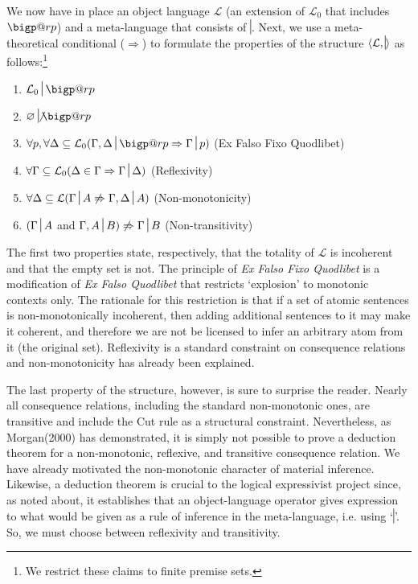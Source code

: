 \documentclass{article}
\makeatletter
\newcommand{\nc}{\turnstile{s}{w}{}{}{n}}
\newcommand{\bigperp}{%
  \mathop{\mathpalette\bigp@rp\relax}%
  \displaylimits
}
\newcommand{\bigp@rp}[2]{%
  \vcenter{
    \m@th\hbox{\scalebox{\ifx#1\displaystyle2.1\else1.5\fi}{$#1\perp$}}
  }%
}
\makeatother
\begin{document}
We now have in place an object language $ \mathcal{L} $ (an extension of  $ \mathcal{L}_0 $ that includes $ \bigperp $) and a meta-language that consists of $ \nc $. Next, we use a meta-theoretical conditional ($ \Rightarrow $) to formulate the properties of the structure $ \langle \mathcal{L}, \nc \rangle  $ as follows:\footnote{We restrict these claims to finite premise sets.}

\begin{enumerate}
	\item $  \mathcal{L}_0\nc\bigperp$
	\item $ \varnothing\not\nc\bigperp $
	\item  $ \forall p, \forall\Delta\subseteq\mathcal{L}_0(\Gamma, \Delta \nc\bigperp \Rightarrow \Gamma\nc p) $ (Ex Falso Fixo Quodlibet)
	\item $\forall \Gamma\subseteq\mathcal{L}_0 (\Delta \in \Gamma \Rightarrow \Gamma\nc \Delta)$ (Reflexivity)
	\item $\forall\Delta\subseteq\mathcal{L}(\Gamma\nc A \not\Rightarrow \Gamma, \Delta \nc A)$ (Non-monotonicity)
	\item $(\Gamma\nc A $ and $ \Gamma, A \nc B ) \not\Rightarrow \Gamma \nc B$ (Non-transitivity)
\end{enumerate}

The first two properties state, respectively, that the totality of $ \mathcal{L} $ is incoherent and that the empty set is not. The principle of \textit{Ex Falso Fixo Quodlibet} is a modification of \textit{Ex Falso Quodlibet} that restricts `explosion' to monotonic contexts only. The rationale for this restriction is that if a set of atomic sentences is non-monotonically incoherent, then adding additional sentences to it may make it coherent, and therefore we are not be licensed to infer an arbitrary atom from it (the original set). Reflexivity is a standard constraint on consequence relations and non-monotonicity has already been explained. 

The last property of the structure, however, is sure to surprise the reader. Nearly all consequence relations, including the standard non-monotonic ones, are transitive and include the Cut rule as a structural constraint. Nevertheless, as Morgan(2000) has demonstrated, it is simply not possible to prove a deduction theorem for a non-monotonic, reflexive, and transitive consequence relation. We have already motivated the non-monotonic character of material inference. Likewise, a deduction theorem is crucial to the logical expressivist project since, as noted about, it establishes that an object-language operator gives expression to what would be given as a rule of inference in the meta-language, i.e. using `$ \nc $'. So, we must choose between  reflexivity and transitivity. 
\end{document}
